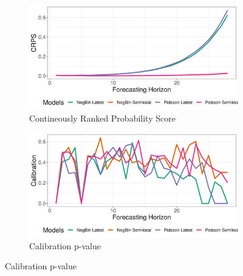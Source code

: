 \begin{figure}[H]
\begin{subfigure}{0.5\textwidth}
  \centering
  \includegraphics[width=\linewidth]{../output/Tchomia_crps.png}  
  \caption{Contineously Ranked Probability Score}
  \label{Tchomia_scores_1}
\end{subfigure}
\begin{subfigure}{0.5\textwidth}
  \centering
  \includegraphics[width=\linewidth]{../output/Tchomia_calibration.png}  
  \caption{Calibration p-value}
  \label{Tchomia_scores_2}
\end{subfigure}


\end{figure}
